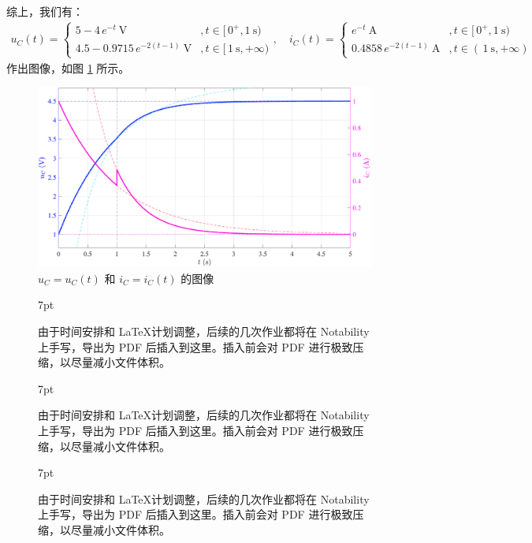\documentclass[UTF8]{report}
\theoremstyle{MyLineTheoremStyle} %
\theoremstyle{MyBlockTheoremStyle} %
\theoremstyle{MySubsubsectionStyle} %
\newenvironment{graybox}{%
        \def\FrameCommand{%
        \hspace{1pt}%
        {\color{gray}\small \vrule width 2pt}%
        {\color{graybox_color}\vrule width 4pt}%
        \colorbox{graybox_color}%
        }%
        \MakeFramed{\advance\hsize-\width\FrameRestore}%
        \noindent\hspace{-4.55pt}%
        \begin{adjustwidth}{}{7pt}%
        \vspace{2pt}\vspace{2pt}%
        }
        {%
        \vspace{2pt}\end{adjustwidth}\endMakeFramed%
        }
\begin{document}
综上，我们有：
\begin{gather}
\boxed{
    u_C(t) = 
    \begin{cases}
        5 - 4 \,e^{-t} \ \mathrm{V} &, t \in [\,0^+, 1 \ \mathrm{s}) \\ 
        4.5 - 0.9715 \,e^{-2(t-1)} \ \mathrm{V} &, t \in [\,1 \ \mathrm{s}, +\infty)
    \end{cases},\quad 
    i_C(t) =
    \begin{cases}
        e^{-t} \ \mathrm{A} &, t \in [\,0^+, 1 \ \mathrm{s}) \\ 
        0.4858 \,e^{-2(t-1)} \ \mathrm{A} &, t \in (\,1 \ \mathrm{s}, +\infty)
    \end{cases}
}
\end{gather}
作出图像，如图 \ref{9.6 习题集 7-35} 所示。

\begin{figure}[H]\centering
\includegraphics[width=\columnwidth]{assets/9/9.6 3.pdf}
\caption{$u_C = u_C(t)$ 和 $i_C = i_C(t)$ 的图像}\label{9.6 习题集 7-35}
\end{figure}

\clearpage  %
\begin{figure}[b]\centering
    \begin{graybox}
    由于时间安排和 \LaTeX 计划调整，后续的几次作业都将在 Notability 上手写，导出为 PDF 后插入到这里。插入前会对 PDF 进行极致压缩，以尽量减小文件体积。
    \end{graybox}
\end{figure}
\begin{figure}[b]\centering
    \begin{graybox}
    由于时间安排和 \LaTeX 计划调整，后续的几次作业都将在 Notability 上手写，导出为 PDF 后插入到这里。插入前会对 PDF 进行极致压缩，以尽量减小文件体积。
    \end{graybox}
\end{figure}
\begin{figure}[b]\centering
    \begin{graybox}
    由于时间安排和 \LaTeX 计划调整，后续的几次作业都将在 Notability 上手写，导出为 PDF 后插入到这里。插入前会对 PDF 进行极致压缩，以尽量减小文件体积。
    \end{graybox}
\end{figure}
\clearpage
\end{document}
